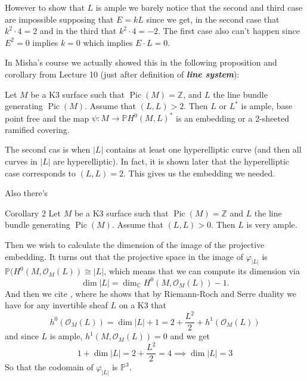 However to show that  $L$ is ample we barely notice that the second and third case are impossible supposing that  $E=kL$ since we get, in the second case that  $k^2\cdot 4=2$ and in the third that $k^2 \cdot 4=-2$. The first case also can't happen since $E^2=0$ implies $k=0$ which implies  $E\cdot L=0$.

\begin{remark}\leavevmode
	
In Misha's course we actually showed this in the following proposition and corollary from Lecture 10 (just after definition of \textit{\textbf{line system}}):

\begin{thm}\leavevmode
	Let $M$ be a K3 surface such that $\operatorname{Pic}(M) =\mathbb{Z}$, and $L$ the line bundle generating $\operatorname{Pic}(M)$. Assume that $(L,L)>2$. Then $L$ or  $L^*$ is ample, base point free and the map $\psi:M\to \mathbb{P}H^{0}(M,L)^*$ is an embedding or a 2-sheeted ramified covering.
\end{thm}

The second cas is when $|L|$ contains at least one hyperelliptic curve (and then all curves in $|L|$ are hyperelliptic). In fact, it is shown later that the hyperelliptic case corresponds to $(L,L)=2$. This gives us the embedding we needed.

Also there's
\begin{thing5}{Corollary 2}\leavevmode
	Let $M$ be a K3 surface such that $\operatorname{Pic}(M) =\mathbb{Z}$ and $L$ the line bundle generating $\operatorname{Pic}(M)$. Assume that $(L,L)>0$. Then  $L$ is very ample.
\end{thing5}
\end{remark}

Then we wish to calculate the dimension of the image of the projective embedding. It turns out that the projective space in the image of $\varphi_{|L|}$ is $\mathbb{P}(H^{0}(M,\mathcal{O}_M(L))\cong |L|$, which means that we can compute its dimension via
\[\dim |L| =\dim_{\mathbb{C}}H^{0}(M,\mathcal{O}_M(L))-1.\]
And then we cite \cite{saint-donat}, where he shows that by Riemann-Roch and Serre duality we have for any invertible sheaf $L$ on a K3 that
\[h^{0}(\mathcal{O}_M(L))=\dim |L| +1=2+\frac{L^2}{2}+h^{1}(\mathcal{O}_M(L))\]
and since $L$ is ample, $h^{1}(M,\mathcal{O}_M(L))=0$ and we get 
\[1+\dim |L| =2+\frac{L^2}{2}=4\implies \dim |L| =3\]
So that the codomain of $\varphi_{|L|}$ is $\mathbb{P}^{3}$.

